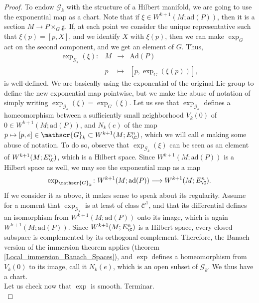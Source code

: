 \begin{proof}
    To endow \(\mathscr{G}_k\) with the structure of a Hilbert manifold, we are going to use the exponential map as a chart. Note that if \(\xi \in W^{k+1}(M;\mathrm{ad}(P))\), then it is a section \(M \to P\times_G \mathfrak{g}\). If, at each point we consider the unique representative such that \(\xi(p)=[p, X]\), and we identify \(X\) with \(\xi(p)\), then we can make \(\exp_G\) act on the second component, and we get an element of \(G\). Thus,
    \[
    \begin{array}{cccc}
        \exp_{\mathscr{G}_k}(\xi) \colon & M & \longrightarrow & \mathrm{Ad}(P) \\
        & p & \mapsto & [p, \exp_G(\xi(p))],
    \end{array}
    \]
    is well-defined. We are basically using the exponential of the original Lie group to define the new exponential map pointwise, but we make the abuse of notation of simply writing \(\exp_{\mathscr{G}_k}(\xi) = \exp_G(\xi)\). Let us see that \(\exp_{\mathscr{G}_k}\) defines a homeomorphism between a sufficiently small neighborhood \(V_k(0)\) of \(0 \in W^{k+1}(M; \mathrm{ad}(P))\), and \(N_k(e)\) of the map \(p \mapsto [p, e] \in \mathscr{G}_k \subset W^{k+1}(M; E_\C^n)\), which we will call \(e\) making some abuse of notation. To do so, observe that \(\exp_{\mathscr{G}_k}(\xi)\) can be seen as an element of \(W^{k+1}(M; E_\C^n)\), which is a Hilbert space. Since \(W^{k+1}(M; \mathrm{ad}(P))\) is a Hilbert space as well, we may see the exponential map as a map
    \[
    \exp_{\mathscr{G}_k} \colon W^{k+1}(M; \mathrm{ad}(P)) \longrightarrow W^{k+1}(M;E_\C^n).
    \]
    If we consider it as above, it makes sense to speak about its regularity. Assume for a moment that \(\exp_{\mathscr{G}_k}\) is at least of class \(\mathscr{C}^1\), and that its differential defines an isomorphism from \(W^{k+1}(M; \mathrm{ad}(P))\) onto its image, which is again \(W^{k+1}(M; \mathrm{ad}(P))\). Since \(W^{k+1}(M; E_\C^n)\) is a Hilbert space, every closed subspace is complemented by its orthogonal complement. Therefore, the Banach version of the immersion theorem applies (theorem \ref{Local_immersion_Banach_Spaces}), and \(\exp\) defines a homeomorphism from \(V_k(0)\) to its image, call it \(N_k(e)\), which is an open subset of \(\mathscr{G}_k\). We thus have a chart. \\

    Let us check now that \(\exp\) is smooth. {\color{red} Terminar.} \\


\end{proof}

